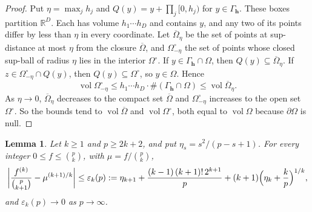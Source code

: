 \documentclass[11pt, a4paper, abstract=yes]{scrartcl}
\theoremstyle{definition}
\theoremstyle{remark}
\theoremstyle{plain}
\newtheorem{lemma}[definition]{Lemma}
\newcommand{\vek}[1]{\boldsymbol{#1}}
\theoremstyle{remark}
\theoremstyle{plain}
\newcommand{\vol}{\operatorname{vol}}
\newcommand{\leannone}{\tikz[baseline=-0.6ex]\draw[leannone,line width=0.6pt] (0,0) circle (0.55ex);}
\newcommand{\leanmark}[1]{\leavevmode{\reversemarginpar\marginnote{\raggedleft#1}}}
\begin{document}
\begin{proof}
Put \(\eta=\max_jh_j\) and \(Q(y)=y+\prod_j[0,h_j)\) for \(y\in\Gamma_{\vek h}\). These boxes
partition \(\mathbb R^D\). Each has volume \(h_1\cdots h_D\) and contains \(y\), and any two of its
points differ by less than \(\eta\) in every coordinate. Let \(\overline\Omega_\eta\) be the set of
points at sup-distance at most \(\eta\) from the closure \(\overline\Omega\), and \(\Omega^\circ_{-\eta}\)
the set of points whose closed sup-ball of radius \(\eta\) lies in the interior \(\Omega^\circ\). If
\(y\in\Gamma_{\vek h}\cap\Omega\), then \(Q(y)\subseteq\overline\Omega_\eta\). If
\(z\in\Omega^\circ_{-\eta}\cap Q(y)\), then \(Q(y)\subseteq\Omega^\circ\), so \(y\in\Omega\). Hence
\[
  \vol\Omega^\circ_{-\eta}\le h_1\cdots h_D\cdot\#(\Gamma_{\vek h}\cap\Omega)\le\vol\overline\Omega_\eta .
\]
As \(\eta\to0\), \(\overline\Omega_\eta\) decreases to the compact set \(\overline\Omega\) and
\(\Omega^\circ_{-\eta}\) increases to the open set \(\Omega^\circ\). So the bounds tend to
\(\vol\overline\Omega\) and \(\vol\Omega^\circ\), both equal to \(\vol\Omega\) because \(\partial\Omega\) is null.
\end{proof}

\begin{lemma}
\leanmark{\leannone}Let \(k\ge1\) and \(p\ge2k+2\), and put \(\eta_s=s^2/(p-s+1)\). For every integer
\(0\le f\le\binom pk\), with \(\mu=f/\binom pk\),
\begin{equation}\label{eq:epsk}
  \biggl\lvert\frac{f^{(k)}}{\binom p{k+1}}-\mu^{(k+1)/k}\biggr\rvert\le\varepsilon_k(p)
  :=\eta_{k+1}+\frac{(k-1)\,(k+1)!\,2^{k+1}}{p}+(k+1)\Bigl(\eta_k+\frac kp\Bigr)^{1/k},
\end{equation}
and \(\varepsilon_k(p)\to0\) as \(p\to\infty\).
\label{lem-pseudo-power}
\end{lemma}
\end{document}
